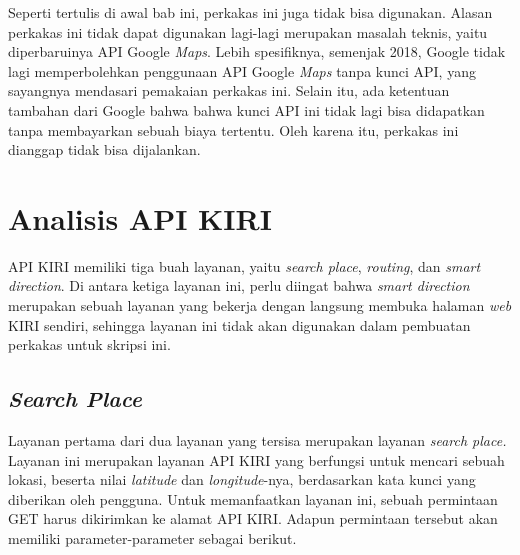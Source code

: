 Seperti tertulis di awal bab ini, perkakas ini juga tidak bisa digunakan. Alasan perkakas ini tidak dapat digunakan lagi-lagi merupakan masalah teknis, yaitu diperbaruinya API Google \textit{Maps}. Lebih spesifiknya, semenjak 2018, Google tidak lagi memperbolehkan penggunaan API Google \textit{Maps} tanpa kunci API, yang sayangnya mendasari pemakaian perkakas ini. Selain itu, ada ketentuan tambahan dari Google bahwa bahwa kunci API ini tidak lagi bisa didapatkan tanpa membayarkan sebuah biaya tertentu. Oleh karena itu, perkakas ini dianggap tidak bisa dijalankan.

\section{Analisis API KIRI}
\label{sec:analysis-kiri}

API KIRI memiliki tiga buah layanan, yaitu \textit{search place}, \textit{routing}, dan \textit{smart direction}. Di antara ketiga layanan ini, perlu diingat bahwa \textit{smart direction} merupakan sebuah layanan yang bekerja dengan langsung membuka halaman \textit{web} KIRI sendiri, sehingga layanan ini tidak akan digunakan dalam pembuatan perkakas \cl\xspace untuk skripsi ini.

\subsection{\textit{Search Place}}
\label{sec:analysis-kiri-searchplace}

Layanan pertama dari dua layanan yang tersisa merupakan layanan \textit{search place.} Layanan ini merupakan layanan API KIRI yang berfungsi untuk mencari sebuah lokasi, beserta nilai \textit{latitude} dan \textit{longitude}-nya, berdasarkan kata kunci yang diberikan oleh pengguna. Untuk memanfaatkan layanan ini, sebuah permintaan GET harus dikirimkan ke alamat API KIRI. Adapun permintaan tersebut akan memiliki parameter-parameter sebagai berikut.

